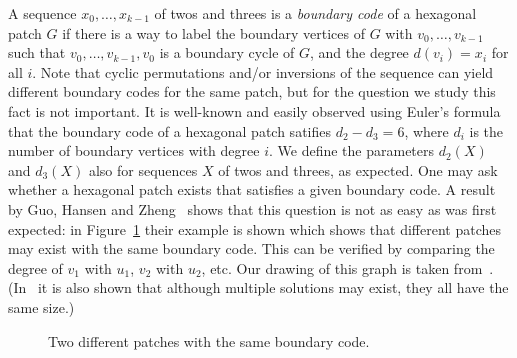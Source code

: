 \documentclass{llncs}
\begin{document}
A sequence $x_0,\ldots,x_{k-1}$ of twos and threes is a {\em boundary code} of a hexagonal patch $G$ if there is a way to label the boundary vertices of $G$ with $v_0,\ldots,v_{k-1}$ such that $v_0,\ldots,v_{k-1},v_0$ is a boundary cycle of $G$, and the degree $d(v_i)=x_i$ for all $i$. Note that cyclic permutations and/or inversions of the sequence can yield different boundary codes for the same patch, but for the question we study this fact is not important.
It is well-known and easily observed using Euler's formula that the boundary code of a hexagonal patch satifies $d_2-d_3=6$, where $d_i$ is the number of boundary vertices with degree $i$. We define the parameters $d_2(X)$ and $d_3(X)$ also for sequences $X$ of twos and threes, as expected.
One may ask whether a hexagonal patch exists that satisfies a given boundary code.
A result by Guo, Hansen and Zheng~\cite{GHZ02} shows that this question is not as easy as was first expected: in Figure~\ref{fig:nontriv} their example is shown which shows that 
different patches may exist with the same boundary code. This can be verified by comparing the degree of $v_1$ with $u_1$, $v_2$ with $u_2$, etc. 
Our drawing of this graph is taken from~\cite{BDN05}. (In~\cite{GHZ02} it is also shown that although multiple solutions may exist, they all have the same size.)
\begin{figure}
\centering
{}
\caption{Two different patches with the same boundary code.}
\label{fig:nontriv}
\end{figure}
\end{document}
